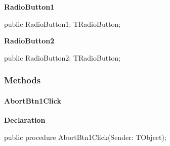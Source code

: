 \documentclass{report}
\newif\ifpdf
\begin{document}
\begin{list}{}
\par  \label{igobase.TIWizFrm-RadioButton1}
\item[\textbf{RadioButton1}\hfill]
\ifpdf
\begin{flushleft}
\fi
\begin{ttfamily}
public RadioButton1: TRadioButton;\end{ttfamily}

\ifpdf
\end{flushleft}
\fi


\par  \label{igobase.TIWizFrm-RadioButton2}
\item[\textbf{RadioButton2}\hfill]
\ifpdf
\begin{flushleft}
\fi
\begin{ttfamily}
public RadioButton2: TRadioButton;\end{ttfamily}

\ifpdf
\end{flushleft}
\fi


\par  \end{list}
\subsubsection*{\large{\textbf{Methods}}\normalsize\hspace{1ex}\hfill}
\paragraph*{AbortBtn1Click}\hspace*{\fill}

\label{igobase.TIWizFrm-AbortBtn1Click}
\begin{list}{}{
\setlength{\itemindent}{0cm}
\setlength{\listparindent}{0cm}
\setlength{\leftmargin}{\evensidemargin}
\addtolength{\leftmargin}{\tmplength}
\settowidth{\labelsep}{X}
\addtolength{\leftmargin}{\labelsep}
\setlength{\labelwidth}{\tmplength}
}
\item[\textbf{Declaration}\hfill]
\ifpdf
\begin{flushleft}
\fi
\begin{ttfamily}
public procedure AbortBtn1Click(Sender: TObject);\end{ttfamily}

\ifpdf
\end{flushleft}
\fi

\end{list}
\end{document}
